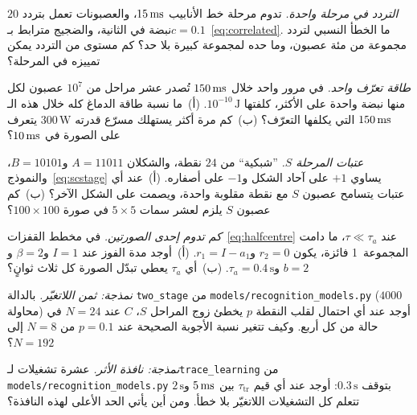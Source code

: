 \begin{exercise}[\lvlA]
\label{ex:12:1}
\emph{التردد في مرحلة واحدة.} تدوم مرحلة خط الأنابيب $15\,\text{ms}$، والعصبونات تعمل بتردد $20$ نبضة في الثانية، والضجيج مترابط بـ$c=0.1$~\eqref{eq:correlated}. ما الخطأ النسبي لتردد مجموعة من مئة عصبون، وما حده لمجموعة كبيرة بلا حد؟ كم مستوى من التردد يمكن تمييزه في المرحلة؟
\end{exercise}

\begin{exercise}[\lvlA]
\label{ex:12:2}
\emph{طاقة تعرّف واحد.} في مرور واحد خلال $150\,\text{ms}$ تُصدر عشر مراحل من $10^7$ عصبون لكل منها نبضة واحدة على الأكثر، كلفتها $10^{-10}\,\text{J}$. (أ)~ما نسبة طاقة الدماغ كله خلال هذه الـ$150\,\text{ms}$ التي يكلفها التعرّف؟ (ب)~كم مرة أكثر يستهلك مسرّع قدرته $300\,\text{W}$ يتعرف على الصورة في $10\,\text{ms}$؟
\end{exercise}

\begin{exercise}[\lvlB]
\label{ex:12:3}
\emph{عتبات المرحلة $S$.} ”شبكية“ من $24$ نقطة، والشكلان $A=11011$ و$B=10101$، والنموذج~\eqref{eq:scstage} يساوي $+1$ على آحاد الشكل و$-1$ على أصفاره. (أ)~عند أي عتبات يتسامح عصبون $S$ مع نقطة مقلوبة واحدة، ويصمت على الشكل الآخر؟ (ب)~كم عصبون $S$ يلزم لعشر سمات $5\times5$ في صورة $100\times100$؟
\end{exercise}

\begin{exercise}[\lvlB]
\label{ex:12:4}
\emph{كم تدوم إحدى الصورتين.} في مخطط القفزات~\eqref{eq:halfcentre} عند $\tau\ll\tau_a$، ما دامت المجموعة~1 فائزة، يكون $r_2=0$ و$r_1=I-a_1$. (أ)~أوجد مدة الفوز عند $I=1$ و$\beta=2$ و$b=2$ و$\tau_a=0.4\,\text{s}$. (ب)~أي $\tau_a$ يعطي تبدّل الصورة كل ثلاث ثوانٍ؟
\end{exercise}

\begin{exercise}[\lvlB]
\label{ex:12:5}
\emph{نمذجة: ثمن اللاتغيّر.} بالدالة \foreignlanguage{english}{\texttt{two\_stage}} من \foreignlanguage{english}{\texttt{models/\allowbreak recognition\_models.py}} ($4000$ محاولة) أوجد عند أي احتمال لقلب النقطة $p$ يخطئ زوج المراحل $S$، $C$ عند $N=24$ في حالة من كل أربع. وكيف تتغير نسبة الأجوبة الصحيحة عند $p=0.1$ من $N=8$ إلى $N=192$؟
\end{exercise}

\begin{exercise}[\lvlB]
\label{ex:12:6}
\emph{نمذجة: نافذة الأثر.} عشرة تشغيلات لـ\foreignlanguage{english}{\texttt{trace\_learning}} من \foreignlanguage{english}{\texttt{models/\allowbreak recognition\_models.py}} بتوقف $0.3\,\text{s}$: أوجد عند أي قيم $\tau_{\text{tr}}$ بين $5\,\text{ms}$ و$2\,\text{s}$ تتعلم كل التشغيلات اللاتغيّر بلا خطأ. ومن أين يأتي الحد الأعلى لهذه النافذة؟
\end{exercise}

